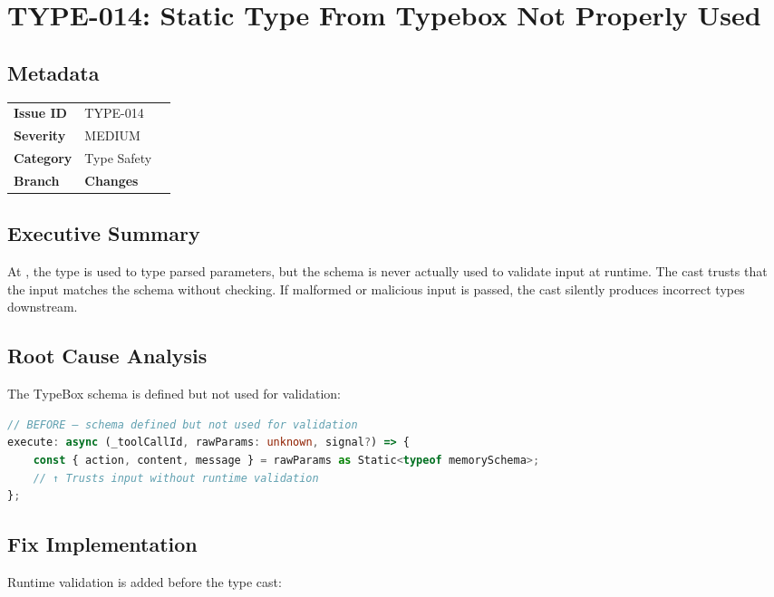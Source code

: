 \section{TYPE-014: Static Type From Typebox Not Properly Used}
\label{sec:type-014}
\subsection*{Metadata}
\begin{tabular}{ll}
\textbf{Issue ID} & TYPE-014 \\
\textbf{Severity} & MEDIUM \\
\textbf{Category} & Type Safety \\
\textbf{Branch} & 
\textbf{Changes} &  \\
\end{tabular}

\subsection*{Executive Summary}
At , the  type is used to type parsed parameters, but the schema is never actually used to validate input at runtime. The  cast trusts that the input matches the schema without checking. If malformed or malicious input is passed, the cast silently produces incorrect types downstream.

\subsection*{Root Cause Analysis}
The TypeBox schema is defined but not used for validation:

\begin{lstlisting}[language=TypeScript]
// BEFORE — schema defined but not used for validation
execute: async (_toolCallId, rawParams: unknown, signal?) => {
    const { action, content, message } = rawParams as Static<typeof memorySchema>;
    // ↑ Trusts input without runtime validation
};
\end{lstlisting}

\subsection*{Fix Implementation}
Runtime validation is added before the type cast:

